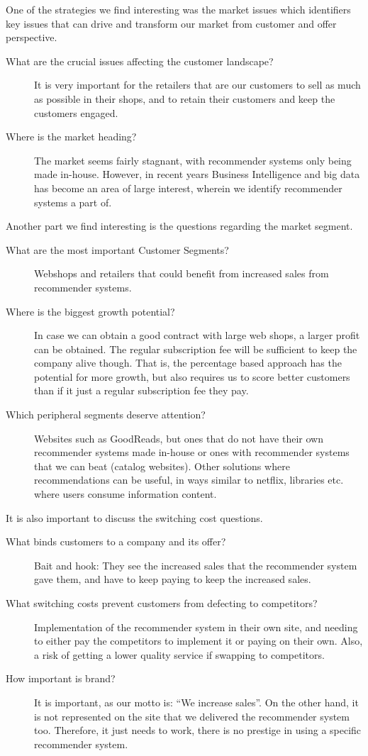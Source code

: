 One of the strategies we find interesting was the market issues which identifiers key issues that can drive and transform our market from customer and offer perspective.
\begin{description}
	\item[What are the crucial issues affecting the customer landscape?] It is very important for the retailers that are our customers to sell as much as possible in their shops, and to retain their customers and keep the customers engaged.
	\item[Where is the market heading?] The market seems fairly stagnant, with recommender systems only being made in-house. However, in recent years Business Intelligence and big data has become an area of large interest, wherein we identify recommender systems a part of.
\end{description}

Another part we find interesting is the questions regarding the market segment.
\begin{description}
	\item[What are the most important Customer Segments?] Webshops and retailers that could benefit from increased sales from recommender systems.
	\item[Where is the biggest growth potential?] In case we can obtain a good contract with large web shops, a larger profit can be obtained. The regular subscription fee will be sufficient to keep the company alive though. That is, the percentage based approach has the potential for more growth, but also requires us to score better customers than if it just a regular subscription fee they pay.
	\item[Which peripheral segments deserve attention?] Websites such as GoodReads, but ones that do not have their own recommender systems made in-house or ones with recommender systems that we can beat (catalog websites). Other solutions where recommendations can be useful, in ways similar to netflix, libraries etc. where users consume information content.
\end{description}

It is also important to discuss the switching cost questions.
\begin{description}
	\item[What binds customers to a company and its offer?] Bait and hook: They see the increased sales that the recommender system gave them, and have to keep paying to keep the increased sales.
	\item[What switching costs prevent customers from defecting to competitors?] Implementation of the recommender system in their own site, and needing to either pay the competitors to implement it or paying on their own. Also, a risk of getting a lower quality service if swapping to competitors.
	\item[How important is brand?] It is important, as our motto is: “We increase sales”. On the other hand, it is not represented on the site that we delivered the recommender system too. Therefore, it just needs to work, there is no prestige in using a specific recommender system.
\end{description}



